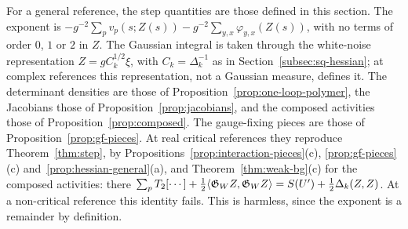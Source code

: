 \begin{remark}\label{rem:source-free}
For a general reference, the step quantities are those defined in this section. The exponent is $-g^{-2}\sum_pv_p(s;Z(s))-g^{-2}\sum_{y,x}\varphi_{y,x}(Z(s))$, with no terms of order $0$, $1$ or $2$ in $Z$. The Gaussian integral is taken through the white-noise representation $Z=gC_k^{1/2}\xi$, with $C_k=\Delta_k^{-1}$ as in Section~\ref{subsec:sq-hessian}; at complex references this representation, not a Gaussian measure, defines it. The determinant densities are those of Proposition~\ref{prop:one-loop-polymer}, the Jacobians those of Proposition~\ref{prop:jacobians}, and the composed activities those of Proposition~\ref{prop:composed}. The gauge-fixing pieces are those of Proposition~\ref{prop:gf-pieces}. At real critical references they reproduce Theorem~\ref{thm:step}, by Propositions~\ref{prop:interaction-pieces}(c), \ref{prop:gf-pieces}(c) and~\ref{prop:hessian-general}(a), and Theorem~\ref{thm:weak-bg}(c) for the composed activities: there $\sum_pT_2[\cdots]+\frac12\langle \mathfrak G_WZ,\mathfrak G_WZ\rangle=S(U')+\frac12\Delta_k(Z,Z)$. At a non-critical reference this identity fails. This is harmless, since the exponent is a remainder by definition.
\end{remark}

